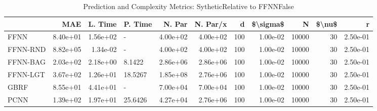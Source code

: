 \begin{table}
\centering
\caption{Prediction and Complexity Metrics: SytheticRelative to FFNNFalse}
\label{tab__Sythetic__Fix_Neurons_QTrue}
\begin{tabular}{lrrlrrrrrrr}
\toprule
{} &      MAE &  L. Time &  P. Time &   N. Par &  N. Par/x &    d &  \$\textbackslash sigma\$ &      N &  \$\textbackslash nu\$ &        r \\
\midrule
FFNN     & 8.40e+01 & 1.56e+02 &        - & 4.00e+02 &  4.00e+02 &  100 &  1.00e-02 &  10000 &     30 & 2.50e-01 \\
FFNN-RND & 8.82e+05 & 1.34e-02 &        - & 4.00e+02 &  4.00e+02 &  100 &  1.00e-02 &  10000 &     30 & 2.50e-01 \\
FFNN-BAG & 2.03e+02 & 2.18e+00 &   8.1422 & 2.86e+06 &  2.86e+06 &  100 &  1.00e-02 &  10000 &     30 & 2.50e-01 \\
FFNN-LGT & 3.67e+02 & 1.26e+01 &  18.5267 & 1.85e+08 &  2.76e+06 &  100 &  1.00e-02 &  10000 &     30 & 2.50e-01 \\
GBRF     & 8.55e+01 & 4.41e+01 &        - & 7.00e+04 &  7.00e+04 &  100 &  1.00e-02 &  10000 &     30 & 2.50e-01 \\
PCNN     & 1.39e+02 & 1.97e+01 &  25.6426 & 4.27e+04 &  2.76e+06 &  100 &  1.00e-02 &  10000 &     30 & 2.50e-01 \\
\bottomrule
\end{tabular}
\end{table}
